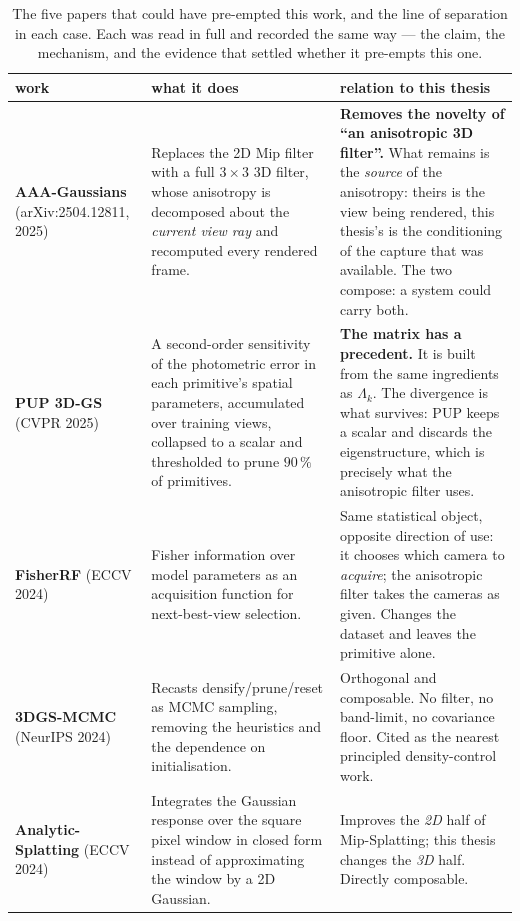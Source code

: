 \begin{table}[htbp]
  \centering
  \caption{The five papers that could have pre-empted this work, and the line of
  separation in each case. Each was read in full and recorded the same way ---
  the claim, the mechanism, and the evidence that settled whether it pre-empts
  this one.}
  \label{tab:related}
  \small
  \begin{tabularx}{\linewidth}{L{0.68}L{1.11}L{1.21}}
    \toprule
    work & what it does & relation to this thesis \\
    \midrule
    \textbf{AAA-Gaussians} (arXiv:2504.12811, 2025)
      & Replaces the 2D Mip filter with a full $3\times3$ 3D filter, whose
        anisotropy is decomposed about the \emph{current view ray} and
        recomputed every rendered frame.
      & \textbf{Removes the novelty of ``an anisotropic 3D filter''.} What
        remains is the \emph{source} of the anisotropy: theirs is the view being
        rendered, this thesis's is the conditioning of the capture that was
        available. The two compose: a system could carry both. \\
    \addlinespace[2pt]
    \textbf{PUP 3D-GS} (CVPR 2025)
      & A second-order sensitivity of the photometric error in each primitive's
        spatial parameters, accumulated over training views, collapsed to a
        scalar and thresholded to prune $90\,\%$ of primitives.
      & \textbf{The matrix has a precedent.} It is built from the same
        ingredients as $\Lambda_k$. The divergence is what survives: PUP keeps a
        scalar and discards the eigenstructure, which is precisely what the anisotropic filter uses. \\
    \addlinespace[2pt]
    \textbf{FisherRF} (ECCV 2024)
      & Fisher information over model parameters as an acquisition function for
        next-best-view selection.
      & Same statistical object, opposite direction of use: it chooses which
        camera to \emph{acquire}; the anisotropic filter takes the cameras as given. Changes the dataset and leaves the primitive alone. \\
    \addlinespace[2pt]
    \textbf{3DGS-MCMC} (NeurIPS 2024)
      & Recasts densify/prune/reset as MCMC sampling, removing the heuristics and
        the dependence on initialisation.
      & Orthogonal and composable. No filter, no band-limit, no covariance floor.
        Cited as the nearest principled density-control work. \\
    \addlinespace[2pt]
    \textbf{Analytic-Splatting} (ECCV 2024)
      & Integrates the Gaussian response over the square pixel window in closed
        form instead of approximating the window by a 2D Gaussian.
      & Improves the \emph{2D} half of Mip-Splatting; this thesis changes the
        \emph{3D} half. Directly composable. \\
    \bottomrule
  \end{tabularx}
\end{table}

